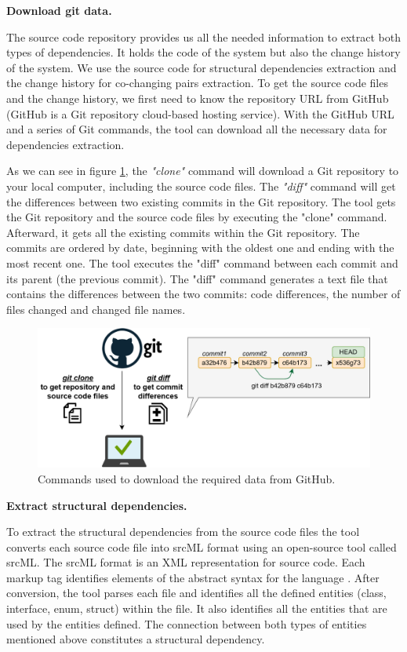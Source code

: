 \documentclass[12pt, a4paper, twoside]{report}
\begin{document}
\textbf{Download git data.}

The source code repository provides us all the needed information to extract both types of dependencies. It holds the code of the system but also the change history of the system. We use the source code for structural dependencies extraction and the change history for co-changing pairs extraction.
To get the source code files and the change history, we first need to know the repository URL from GitHub (GitHub is a Git repository cloud-based hosting service). With the GitHub URL and a series of Git commands, the tool can download all the necessary data for dependencies extraction.

As we can see in figure \ref{fig:figgitdata}, the \textit{"clone"} command will download a Git repository to your local computer, including the source code files. The \textit{"diff"} command will get the differences between two existing commits in the Git repository. 
The tool gets the Git repository and the source code files by executing the "clone" command. Afterward, it gets all the existing commits within the Git repository. The commits are ordered by date, beginning with the oldest one and ending with the most recent one. The tool executes the "diff" command between each commit and its parent (the previous commit). The "diff" command generates a text file that contains the differences between the two commits: code differences, the number of files changed and changed file names.


\begin{figure}[H]
\centering
\includegraphics[width=\textwidth]{gitdata.png}
\caption{Commands used to download the required data from GitHub.}
\label{fig:figgitdata}
\end{figure}

\textbf{Extract structural dependencies.}

To extract the structural dependencies from the source code files the tool converts each source code file into srcML format using an open-source tool called srcML. The srcML format is an XML representation for source code. Each markup tag identifies elements of the abstract syntax for the language \cite{srcML}. 
After conversion, the tool parses each file and identifies all the defined entities (class, interface, enum, struct) within the file. It also identifies all the entities that are used by the entities defined.  The connection between both types of entities mentioned above constitutes a structural dependency.
\end{document}
